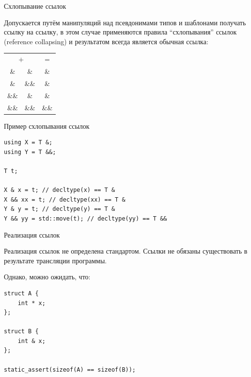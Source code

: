 \documentclass[unknownkeysallowed,xcolor=table]{beamer}
\begin{document}
\begin{frame}{Схлопывание ссылок}

Допускается путём манипуляций над псевдонимами типов и шаблонами получать ссылку на ссылку, в этом случае применяются правила ``схлопывания'' ссылок (reference collapsing) и результатом всегда является обычная ссылка:

\vspace{2em}

\begin{center}
\begin{tabular}{ c c | c }
  \hline
    \multicolumn{2}{c|}{$+$} & $=$ \\
     \& & \& & \& \\
     \& & \&\& & \& \\
     \&\& & \& & \& \\
     \&\& & \&\& & \&\& \\
\end{tabular}
\end{center}

\end{frame}

\begin{frame}[fragile]{Пример схлопывания ссылок}

\begin{lstlisting}
using X = T &;
using Y = T &&;

T t;

X & x = t; // decltype(x) == T &
X && xx = t; // decltype(xx) == T &
Y & y = t; // decltype(y) == T &
Y && yy = std::move(t); // decltype(yy) == T &&
\end{lstlisting}

\end{frame}

\begin{frame}[fragile]{Реализация ссылок}

Реализация ссылок не определена стандартом. Ссылки не обязаны существовать в результате трансляции программы.

\vspace{1em}

Однако, можно ожидать, что:

\vspace{1em}

\begin{lstlisting}
struct A {
    int * x;
};

struct B {
    int & x;
};

static_assert(sizeof(A) == sizeof(B));
\end{lstlisting}

\end{frame}
\end{document}
